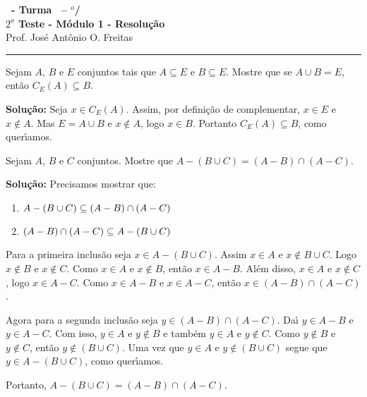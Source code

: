 \documentclass[12pt]{exam}
\begin{document}
\begin{center}
{\Large\bf \disciplina\ - Turma \turma\ -- \semestre$^{o}$/\ano} \\ \vspace{9pt} {\large\bf
$2^{\underline{o}}$ Teste - M\'odulo 1 - Resolu\c{c}\~ao}\\
\vspace{9pt} Prof. Jos{\'e} Ant{\^o}nio O. Freitas
\end{center}
\hrule

\vspace{.6cm}

\questao Sejam $A$, $B$ e $E$ conjuntos tais que $A \subseteq E$ e $B \subseteq E$. Mostre que se $A \cup B = E$, ent\~ao $C_E(A) \subseteq B$.

\noindent\textbf{Solu\c{c}\~ao:} Seja $x \in C_E(A)$. Assim, por defini\c{c}\~ao de complementar, $x \in E$ e $x \notin A$. Mas $E = A \cup B$ e $x \notin A$, logo $x \in B$. Portanto $C_E(A) \subseteq B$, como quer{\'\i}amos.

\vspace{.5cm}

\questao Sejam $A$, $B$ e $C$ conjuntos. Mostre que $A - (B \cup C) = (A - B) \cap (A - C)$.

\noindent\textbf{Solu\c{c}\~ao:} Precisamos mostrar que:
\begin{enumerate}[label={\roman*})]
	\item $A - (B \cup C) \subseteq (A - B) \cap (A - C)$
	\item $(A - B) \cap (A - C) \subseteq A - (B \cup C)$
\end{enumerate}

Para a primeira inclus\~ao seja $x \in A - (B \cup C)$. Assim $x \in A$ e $x \notin B \cup C$. Logo $x \notin B$ e $x \notin C$. Como $x \in A$ e $x \notin B$, ent\~ao $x \in A - B$. Al\'em disso, $x \in A$ e $x \notin C$, logo $x \in A - C$. Como $x \in A - B$ e $x \in A - C$, ent\~ao $x \in (A - B) \cap (A - C)$.

Agora para a segunda inclus\~ao seja $y \in (A - B) \cap (A - C)$. Da{\'\i} $y \in A - B$ e $y \in A - C$. Com isso, $y \in A$ e $y \notin B$ e tamb\'em $y \in A$ e $y \notin C$. Como $y \notin B$ e $y \notin C$, ent\~ao $y \notin (B \cup C)$. Uma vez que $y \in A$ e $y \notin (B \cup C)$ segue que $y \in A - (B \cup C)$, como quer{\'\i}amos.

Portanto, $A - (B \cup C) = (A - B) \cap (A - C)$.
\end{document}
